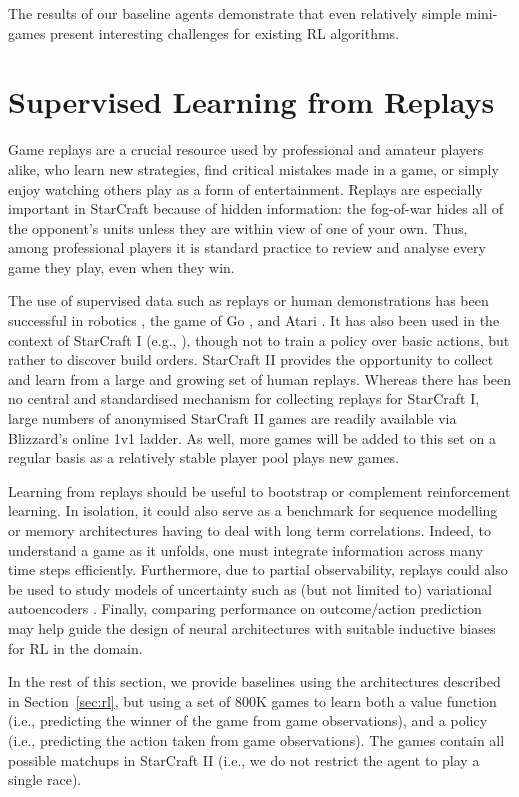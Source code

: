 The results of our baseline agents demonstrate that even relatively simple mini-games present interesting challenges for existing RL algorithms.

\section{Supervised Learning from Replays}\label{sec:sl}

Game replays are a crucial resource used by professional and amateur players alike, who learn new strategies, find critical mistakes made in a game, or simply enjoy watching others play as a form of entertainment. Replays are especially important in StarCraft because of hidden information:  the fog-of-war hides all of the opponent's units unless they are within view of one of your own. Thus, among professional players it is standard practice to review and analyse every game they play, even when they win. 

The use of supervised data such as replays or human demonstrations has been successful in robotics \cite{argall2009survey,popov2017data}, the game of Go \cite{maddison2014move,silver2016mastering}, and Atari \cite{hester2017learning}. It has also been used in the context of StarCraft I (e.g., \cite{justesen2017learning}), though not to train a policy over basic actions, but rather to discover build orders. StarCraft II provides the opportunity to collect and learn from a large and growing set of human replays. Whereas there has been no central and standardised mechanism for collecting replays for StarCraft I, large numbers of anonymised StarCraft II games are readily available via Blizzard's online 1v1 ladder.  As well, more games will be added to this set on a regular basis as a relatively stable player pool plays new games.

Learning from replays should be useful to bootstrap or complement reinforcement learning.  In isolation, it could also serve as a benchmark for sequence modelling or memory architectures having to deal with long term correlations. Indeed, to understand a game as it unfolds, one must integrate information across many time steps efficiently. Furthermore, due to partial observability, replays could also be used to study models of uncertainty such as (but not limited to) variational autoencoders \cite{Kingma:2014}. Finally, comparing performance on outcome/action prediction may help guide the design of neural architectures with suitable inductive biases for RL in the domain.

In the rest of this section, we provide baselines using the architectures described in Section~\ref{sec:rl}, but using a set of 800K games to learn both a value function (i.e., predicting the winner of the game from game observations), and a policy (i.e., predicting the action taken from game observations). The games contain all possible matchups in StarCraft II (i.e., we do not restrict the agent to play a single race). 

